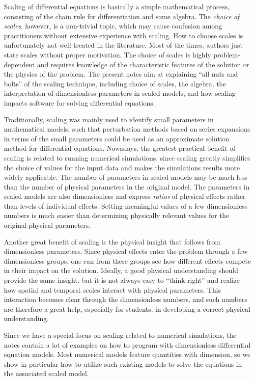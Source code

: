 \documentclass[graybox,envcountchap,sectrefs,final]{svmonodo}
\begin{document}
Scaling of differential equations is basically a simple mathematical
process, consisting of the chain rule for differentiation and some
algebra.  The \emph{choice of scales}, however, is a non-trivial topic,
which may cause confusion among practitioners without extensive
experience with scaling.  How to choose scales is unfortunately not
well treated in the literature. Most of the times, authors just state
scales without proper motivation. The choice of scales is highly
problem-dependent and requires knowledge of the characteristic
features of the solution or the physics of the problem.  The present
notes aim at explaining ``all nuts and bolts'' of the scaling
technique, including choice of scales, the algebra, the interpretation
of dimensionless parameters in scaled models, and how scaling impacts
software for solving differential equations.

Traditionally, scaling was mainly used to identify small parameters in
mathematical models, such that perturbation methods based on series
expansions in terms of the small parameters could be used as an
approximate solution method for differential equations.  Nowadays, the
greatest practical benefit of scaling is related to running numerical
simulations, since scaling greatly simplifies the choice of values for
the input data and makes the simulations results more widely
applicable.  The number of parameters in scaled models may be much
less than the number of physical parameters in the original model. The
parameters in scaled models are also dimensionless and express
\emph{ratios} of physical effects rather than levels of individual
effects.  Setting meaningful values of a few dimensionless numbers is
much easier than determining physically relevant values for the
original physical parameters.

Another great benefit of scaling is the physical insight that follows
from dimensionless parameters. Since physical effects enter the
problem through a few dimensionless groups, one can from these groups
see how different effects compete in their impact on the
solution. Ideally, a good physical understanding should provide the
same insight, but it is not always easy to ``think right'' and realize
how spatial and temporal scales interact with physical parameters.
This interaction becomes clear through the dimensionless numbers, and
such numbers are therefore a great help, especially for students, in
developing a correct physical understanding.

Since we have a special focus on scaling related to numerical
simulations, the notes contain a lot of examples on how to program
with dimensionless differential equation models. Most numerical models
feature quantities with dimension, so we show in particular how to
utilize such existing models to solve the equations in the associated
scaled model.
\end{document}
